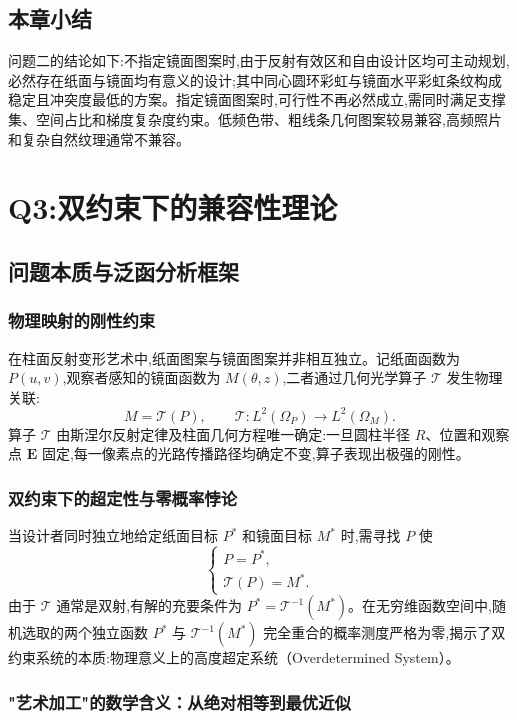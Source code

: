 \documentclass[12pt, a4paper]{ctexart}
\begin{document}
\subsection{本章小结}
问题二的结论如下:不指定镜面图案时,由于反射有效区和自由设计区均可主动规划,必然存在纸面与镜面均有意义的设计;其中同心圆环彩虹与镜面水平彩虹条纹构成稳定且冲突度最低的方案。指定镜面图案时,可行性不再必然成立,需同时满足支撑集、空间占比和梯度复杂度约束。低频色带、粗线条几何图案较易兼容,高频照片和复杂自然纹理通常不兼容。

\section{Q3:双约束下的兼容性理论}
\subsection{问题本质与泛函分析框架}

\subsubsection{物理映射的刚性约束}

在柱面反射变形艺术中,纸面图案与镜面图案并非相互独立。记纸面函数为 $P(u,v)$,观察者感知的镜面函数为 $M(\theta,z)$,二者通过几何光学算子 $\mathcal{T}$ 发生物理关联:
\[
M = \mathcal{T}(P), \qquad \mathcal{T}: L^2(\Omega_P) \to L^2(\Omega_M).
\]
算子 $\mathcal{T}$ 由斯涅尔反射定律及柱面几何方程唯一确定:一旦圆柱半径 $R$、位置和观察点 $\mathbf{E}$ 固定,每一像素点的光路传播路径均确定不变,算子表现出极强的刚性。

\subsubsection{双约束下的超定性与零概率悖论}

当设计者同时独立地给定纸面目标 $P^*$ 和镜面目标 $M^*$ 时,需寻找 $P$ 使
\[
\begin{cases}
P = P^*, \\
\mathcal{T}(P) = M^*.
\end{cases}
\]
由于 $\mathcal{T}$ 通常是双射,有解的充要条件为 $P^* = \mathcal{T}^{-1}(M^*)$。在无穷维函数空间中,随机选取的两个独立函数 $P^*$ 与 $\mathcal{T}^{-1}(M^*)$ 完全重合的概率测度严格为零,揭示了双约束系统的本质:物理意义上的高度超定系统（Overdetermined System）。

\subsubsection{"艺术加工"的数学含义：从绝对相等到最优近似}
\end{document}
